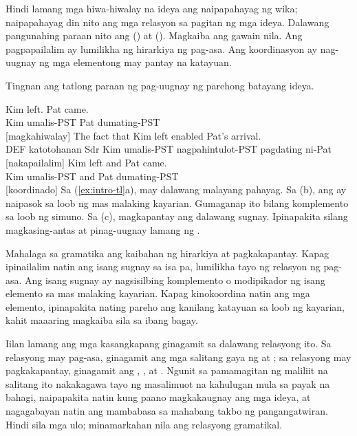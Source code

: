 Hindi lamang mga hiwa-hiwalay na ideya ang naipapahayag ng wika; naipapahayag din nito ang mga relasyon sa pagitan ng mga ideya. Dalawang pangunahing paraan nito ang  () at  (). Magkaiba ang gawain nila. Ang pagpapailalim ay lumilikha ng hirarkiya ng pag-asa. Ang koordinasyon ay nag-uugnay ng mga elementong may pantay na katayuan.

Tingnan ang tatlong paraan ng pag-uugnay ng parehong batayang ideya.

\ea \label{ex:intro-tl}
    \ea \gll Kim left. Pat came.\\
        Kim umalis-PST Pat dumating-PST\\
    \glt {} [magkahiwalay]
    \ex \gll The fact {\ob}that Kim left{\cb} enabled Pat's arrival.\\
        DEF katotohanan Sdr Kim umalis-PST nagpahintulot-PST pagdating ni-Pat\\
    \glt {} [nakapailalim]
    \ex \gll Kim left and Pat came.\\
        Kim umalis-PST and Pat dumating-PST\\
    \glt {} [koordinado]
    \z
\z
Sa (\ref{ex:intro-tl}a), may dalawang malayang pahayag. Sa (b), ang  ay naipasok sa loob ng mas malaking kayarian. Gumaganap ito bilang komplemento sa loob ng simuno. Sa (c), magkapantay ang dalawang sugnay. Ipinapakita silang magkasing-antas at pinag-uugnay lamang ng .

Mahalaga sa gramatika ang kaibahan ng hirarkiya at pagkakapantay. Kapag ipinailalim natin ang isang sugnay sa isa pa, lumilikha tayo ng relasyon ng pag-asa. Ang isang sugnay ay nagsisilbing komplemento o modipikador ng isang elemento sa mas malaking kayarian. Kapag kinokoordina natin ang mga elemento, ipinapakita nating pareho ang kanilang katayuan sa loob ng kayarian, kahit maaaring magkaiba sila sa ibang bagay.

Iilan lamang ang mga kasangkapang ginagamit sa dalawang relasyong ito. Sa relasyong may pag-asa, ginagamit ang mga salitang gaya ng  at ; sa relasyong may pagkakapantay, ginagamit ang , , at . Ngunit sa pamamagitan ng maliliit na salitang ito nakakagawa tayo ng masalimuot na kahulugan mula sa payak na bahagi, naipapakita natin kung paano magkakaugnay ang mga ideya, at nagagabayan natin ang mambabasa sa mahabang takbo ng pangangatwiran. Hindi sila mga ulo; minamarkahan nila ang relasyong gramatikal.

